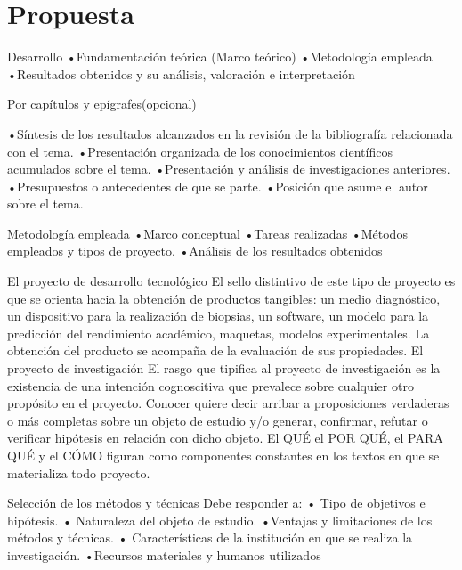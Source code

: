 \chapter{Propuesta}\label{chapter:proposal}
Desarrollo
•Fundamentación teórica (Marco 
teórico)
•Metodología empleada
•Resultados obtenidos y su análisis, 
valoración e interpretación

Por capítulos 
y epígrafes(opcional)

•Síntesis de los resultados alcanzados en la
revisión de la bibliografía relacionada con el
tema.
•Presentación organizada de los
conocimientos científicos acumulados sobre
el tema.
•Presentación y análisis de investigaciones
anteriores.
•Presupuestos o antecedentes de que se
parte.
•Posición que asume el autor sobre el tema.

Metodología empleada
•Marco conceptual
•Tareas realizadas
•Métodos empleados y tipos de 
proyecto.
•Análisis de los resultados obtenidos

El proyecto de desarrollo tecnológico
El sello distintivo de este tipo de proyecto es que se orienta hacia
la obtención de productos tangibles: un medio diagnóstico, un
dispositivo para la realización de biopsias, un software, un
modelo para la predicción del rendimiento académico,
maquetas, modelos experimentales.
La obtención del producto se acompaña de la evaluación de
sus propiedades.
El proyecto de investigación
El rasgo que tipifica al proyecto de investigación es la existencia de
una intención cognoscitiva que prevalece sobre cualquier otro
propósito en el proyecto. Conocer quiere decir arribar a
proposiciones verdaderas o más completas sobre un objeto de
estudio y/o generar, confirmar, refutar o verificar hipótesis en
relación con dicho objeto.
El QUÉ el POR QUÉ, el PARA QUÉ y el CÓMO figuran como
componentes constantes en los textos en que se materializa todo
proyecto.

Selección de los métodos y técnicas
Debe responder a:
• Tipo de objetivos e hipótesis.
• Naturaleza del objeto de estudio.
•Ventajas y limitaciones de los métodos y 
técnicas.
• Características de la institución en que se 
realiza la investigación.
•Recursos materiales y humanos utilizados